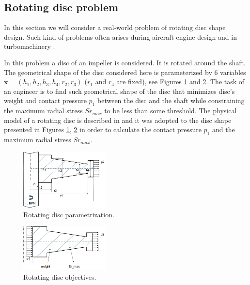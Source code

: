 \subsection{Rotating disc problem}

In this section we will consider a real-world problem of rotating disc shape design.
Such kind of problems often arises during aircraft engine design and in turbomachinery \citep{armand1995structural}.

In this problem a disc of an impeller is considered.
It is rotated around the shaft.
The geometrical shape of the disc considered here is parameterized by 6 variables
$\mathbf{x} = (h_1, h_2, h_3, h_4, r_2, r_3)$ ($r_1$ and $r_4$ are fixed), see Figures \ref{fig:rotating_disc_parametrization} and \ref{fig:rotating_disc_objectives}.
The task of an engineer is to find such geometrical shape of the disc that minimizes disc's weight and contact pressure $p_1$ between
the disc and the shaft while constraining the maximum radial stress $Sr_{max}$ to be less than some threshold.
The physical model of a rotating disc is described in \citep{armand1995structural} and it was adopted to the disc shape
presented in Figures \ref{fig:rotating_disc_parametrization}, \ref{fig:rotating_disc_objectives} in order to calculate the contact pressure $p_1$
and the maximum radial stress $Sr_{max}$.

\begin{figure}
  \centering
  \includegraphics[width=0.4\textwidth]{figures/gp_on_grid/rotating_disk_parametrization.png}
  \caption{Rotating disc parametrization.}
  \label{fig:rotating_disc_parametrization}
\end{figure}

\begin{figure}
  \centering
  \includegraphics[width=0.4\textwidth]{figures/gp_on_grid/rotating_disk_objectives.png}
  \caption{Rotating disc objectives.}
  \label{fig:rotating_disc_objectives}
\end{figure}

